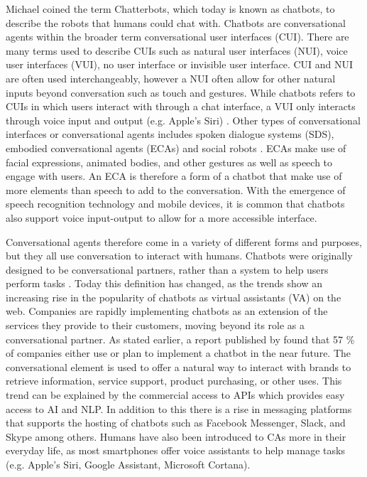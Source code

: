 Michael \cite{Mauldin1994} coined the term Chatterbots, which today is known as chatbots, to describe the robots that humans could chat with. Chatbots are conversational agents within the broader term conversational user interfaces (CUI). There are many terms used to describe CUIs such as natural user interfaces (NUI), voice user interfaces (VUI), no user interface or invisible user interface.  CUI and NUI are often used interchangeably, however a NUI often allow for other natural inputs beyond conversation such as touch and gestures. While chatbots refers to CUIs in which users interact with through a chat interface, a VUI only interacts through voice input and output (e.g. Apple's Siri) \citep{Pearl2017}. Other types of conversational interfaces or conversational agents includes spoken dialogue systems (SDS), embodied conversational agents (ECAs) and social robots \citep{McTear2016b}. ECAs make use of facial expressions, animated bodies, and other gestures as well as speech to engage with users. An ECA is therefore a form of a chatbot that make use of more elements than speech to add to the conversation. With the emergence of speech recognition technology and mobile devices, it is common that chatbots also support voice input-output to allow for a more accessible interface.

Conversational agents therefore come in a variety of different forms and purposes, but they all use conversation to interact with humans. Chatbots were originally designed to be conversational partners, rather than a system to help users perform tasks \citep{McTear2016a}. Today this definition has changed, as the trends show an increasing rise in the popularity of chatbots as virtual assistants (VA) on the web. Companies are rapidly implementing chatbots as an extension of the services they provide to their customers, moving beyond its role as a conversational partner. As stated earlier, a report published by \cite{forrester2017} found that 57 \% of companies either use or plan to implement a chatbot in the near future. The conversational element is used to offer a natural way to interact with brands to retrieve information, service support, product purchasing, or other uses. This trend can be explained by the commercial access to APIs which provides easy access to AI and NLP. In addition to this there is a rise in messaging platforms that supports the hosting of chatbots such as Facebook Messenger, Slack, and Skype among others. Humans have also been introduced to CAs more in their everyday life, as most smartphones offer voice assistants to help manage tasks (e.g. Apple's Siri, Google Assistant, Microsoft Cortana).

